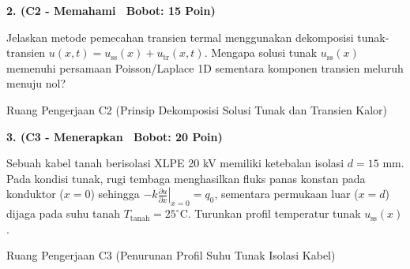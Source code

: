 \documentclass[10pt,a4paper]{article}
\begin{document}
\vspace{1mm}

\noindent\textbf{2. (C2 - Memahami \textbar\ Bobot: 15 Poin)}\par\vspace{0.5mm}
{\footnotesize Jelaskan metode pemecahan transien termal menggunakan dekomposisi tunak-transien $u(x,t) = u_{\text{ss}}(x) + u_{\text{tr}}(x,t)$. Mengapa solusi tunak $u_{\text{ss}}(x)$ memenuhi persamaan Poisson/Laplace 1D sementara komponen transien meluruh menuju nol?}
\begin{answerbox}{Ruang Pengerjaan C2 (Prinsip Dekomposisi Solusi Tunak dan Transien Kalor)}
  \vspace{2.1cm}
\end{answerbox}

\vspace{1mm}

\noindent\textbf{3. (C3 - Menerapkan \textbar\ Bobot: 20 Poin)}\par\vspace{0.5mm}
\noindent\begin{minipage}[t]{0.60\textwidth}%
  {\footnotesize Sebuah kabel tanah berisolasi XLPE 20 kV memiliki ketebalan isolasi $d=15\text{ mm}$. Pada kondisi tunak, rugi tembaga menghasilkan fluks panas konstan pada konduktor ($x=0$) sehingga $-k \left.\frac{\partial u}{\partial x}\right|_{x=0} = q_0$, sementara permukaan luar ($x=d$) dijaga pada suhu tanah $T_{\text{tanah}} = 25^\circ\text{C}$. Turunkan profil temperatur tunak $u_{\text{ss}}(x)$.}%
\end{minipage}%
\hfill%
\begin{minipage}[t]{0.37\textwidth}%
  \centering
\end{minipage}\par\vspace{1mm}
\begin{answerbox}{Ruang Pengerjaan C3 (Penurunan Profil Suhu Tunak Isolasi Kabel)}
  \vspace{2.8cm}
\end{answerbox}
\end{document}
